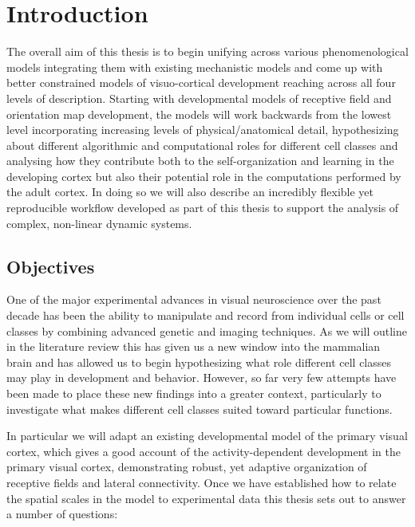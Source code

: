 \chapter{Introduction}

The overall aim of this thesis is to begin unifying across various
phenomenological models integrating them with existing mechanistic
models and come up with better constrained models of visuo-cortical
development reaching across all four levels of description. Starting
with developmental models of receptive field and orientation map
development, the models will work backwards from the lowest level
incorporating increasing levels of physical/anatomical detail,
hypothesizing about different algorithmic and computational roles for
different cell classes and analysing how they contribute both to the
self-organization and learning in the developing cortex but also their
potential role in the computations performed by the adult cortex. In
doing so we will also describe an incredibly flexible yet reproducible
workflow developed as part of this thesis to support the analysis of
complex, non-linear dynamic systems.

\section{Objectives}

One of the major experimental advances in visual neuroscience over the
past decade has been the ability to manipulate and record from
individual cells or cell classes by combining advanced genetic and
imaging techniques. As we will outline in the literature review this
has given us a new window into the mammalian brain and has allowed us
to begin hypothesizing what role different cell classes may play in
development and behavior. However, so far very few attempts have been
made to place these new findings into a greater context, particularly
to investigate what makes different cell classes suited toward
particular functions.

In particular we will adapt an existing developmental model of the
primary visual cortex, which gives a good account of the
activity-dependent development in the primary visual cortex,
demonstrating robust, yet adaptive organization of receptive fields
and lateral connectivity. Once we have established how to relate the
spatial scales in the model to experimental data this thesis sets out
to answer a number of questions:

